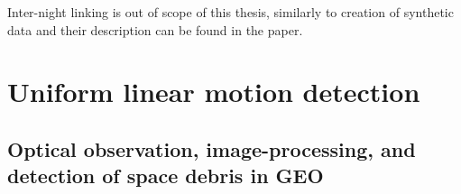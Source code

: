 	Inter-night linking is out of scope of this thesis, similarly to creation of synthetic data and their description can be found in the paper.

\section{Uniform linear motion detection}\label{sec:linear_motion}
	
	

\subsection{Optical observation, image-processing, and detection of space debris in GEO}\label{subsec:linear_geo}